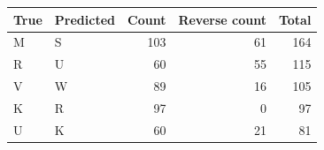 \begin{tabular}{llrrr}
\toprule
True & Predicted & Count & Reverse count & Total \\
\midrule
M & S & 103 & 61 & 164 \\
R & U & 60 & 55 & 115 \\
V & W & 89 & 16 & 105 \\
K & R & 97 & 0 & 97 \\
U & K & 60 & 21 & 81 \\
\bottomrule
\end{tabular}
